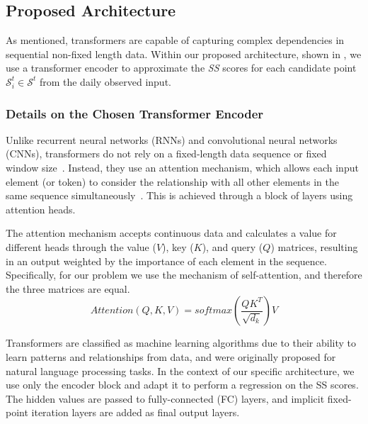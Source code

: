 \subsection{Proposed Architecture}
\label{subsec:architecture}

As mentioned, transformers are capable of capturing complex dependencies in sequential non-fixed length data.
Within our proposed architecture, shown in , we use a transformer encoder to approximate the \textit{SS} scores
for each candidate point $\mathcal{S}_{i}^{t} \in \mathcal{S}^{t}$ from the daily observed input.

\subsubsection{Details on the Chosen Transformer Encoder}

Unlike recurrent neural networks (RNNs) and convolutional neural networks (CNNs),
transformers do not rely on a fixed-length data sequence or fixed window size~\citep{Wen2023}.
Instead, they use an attention mechanism, which allows each input element (or token) to consider the relationship
with all other elements in the same sequence simultaneously~\citep{Vaswani2023}.
This is achieved through a block of layers using attention heads.

The attention mechanism accepts continuous data and calculates a value for different heads through the
value ($V$), key ($K$), and query ($Q$) matrices,
resulting in an output weighted by the importance of each element in the sequence.
Specifically, for our problem we use the mechanism of self-attention, and therefore the three matrices are equal.
\begin{equation}
    \label{eq:attention}
    \textit{Attention}(Q, K, V) = \textit{softmax}\left(\frac{QK^T}{\sqrt{d_k}}\right)V
\end{equation}

Transformers are classified as machine learning algorithms due to their ability to learn patterns and relationships from data,
and were originally proposed for natural language processing tasks.
In the context of our specific architecture, we use only the encoder block and adapt it to perform a regression on the SS scores.
The hidden values are passed to fully-connected (FC) layers, and implicit fixed-point iteration layers are added as final output layers.


